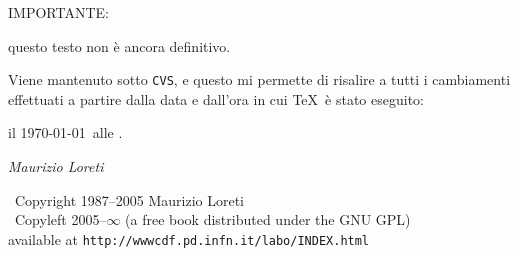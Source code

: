 \begin{center}
  {\bfseries
    {\huge IMPORTANTE:\par}\vspace*{5mm}
    {\Large questo testo non \`e ancora
      definitivo.\par}\vspace*{5mm}
    {\large Viene mantenuto sotto \verb|CVS|, e questo
      mi permette di risalire a tutti i cambiamenti
      effettuati a partire dalla data e dall'ora in
      cui \TeX\ \`e stato eseguito:\par}\vspace*{5mm}
    {\Large il \today\ alle \daytime.\par}}\vspace*{5mm}
  {\Large\itshape Maurizio Loreti\par}
  \vspace*{30mm}
  {\small\textcopyright\ Copyright 1987--2005 Maurizio
    Loreti \\
    \copyleft\ Copyleft 2005--$\infty$ (a free book
    distributed under the GNU GPL) \\[1ex]
    available at \texttt{http://wwwcdf.pd.infn.it/labo/INDEX.html}
  }
\end{center}
\clearpage
\setcounter{page}{1}
\pagestyle{headings}
\thispagestyle{headings}
\tableofcontents
\cleardoublepage
{}
\listoffigures

\endinput
